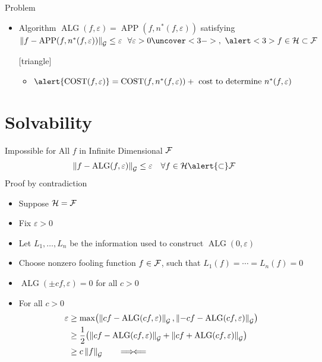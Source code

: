 \documentclass[10pt,compress,xcolor={usenames,dvipsnames},aspectratio=169]{beamer}
\newcommand{\contradiction}{%
  \ensuremath{{\Longrightarrow\mspace{-2mu}\Longleftarrow}}%
}
\DeclareMathOperator{\app}{APP}
\DeclareMathOperator{\alg}{ALG}
\DeclareMathOperator{\COST}{COST}
\begin{document}
\begin{frame}{Problem}
\begin{itemize}[]
	\item<2-> Algorithm $\alg(f,\varepsilon) = \app(f,n^*(f,\varepsilon))$ satisfying  
	$\norm[\cg]{f -  \app(f,n^*(f,\varepsilon))} \le \varepsilon \ \  \forall \varepsilon > 0 \uncover<3->{,\ \alert<3>{f \in \ch \subset \cf}}$
	
	[triangle]
		\begin{itemize}
	    \item $ \alert{\COST(f,\varepsilon)} = \COST(f,n^*(f,\varepsilon)) + \text{ cost to determine } n^*(f,\varepsilon)$
	\end{itemize}


\end{itemize}

\end{frame}

\section{Solvability}

\begin{frame}{Impossible for All $f$ in Infinite Dimensional $\mathcal{F}$}
\vspace{-5ex}
\[
\norm[\cg]{f - \alg(f,\varepsilon)} \le \varepsilon \quad \forall f \in \ch \alert{\subset} \cf
\]
\alert{Proof by contradiction}

\vspace{-3ex}
\begin{itemize}
    \item Suppose $\mathcal{H} = \mathcal{F}$
    
    \item Fix $\varepsilon > 0$
    
    \item Let $L_1, \ldots, L_n$ be the information used to construct $\alg(0,\varepsilon)$
    
    \item Choose \alert{nonzero fooling function} $f \in \mathcal{F}$, such that $L_1(f) = \cdots = L_n(f) = 0$
    
    \item $\alg(\pm cf,\varepsilon) = 0$ for all $c > 0$
    
    \item For all $c > 0$
    \begin{align*}
        \varepsilon & \ge \max\bigl(\norm[\cg]{cf - \alg(cf,\varepsilon)}, \norm[\cg]{-cf - \alg(cf,\varepsilon)} \bigr) \\
        & \ge \frac 12 \bigl(\norm[\cg]{cf - \alg(cf,\varepsilon)} + \norm[\cg]{cf + \alg(cf,\varepsilon)} \bigr) \\
        & \ge  c \norm[\cg]{f} \qquad \contradiction
    \end{align*}
    
\end{itemize}

\end{frame}
\end{document}
